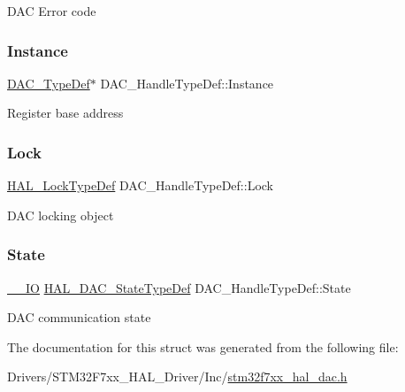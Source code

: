 D\+AC Error code \mbox{\label{struct_d_a_c___handle_type_def_ac25a3f9270f3e98c4104361209ed1a49}} 
\subsubsection{\texorpdfstring{Instance}{Instance}}
{\footnotesize\ttfamily \mbox{\hyperlink{struct_d_a_c___type_def}{D\+A\+C\+\_\+\+Type\+Def}}$\ast$ D\+A\+C\+\_\+\+Handle\+Type\+Def\+::\+Instance}

Register base address \mbox{\label{struct_d_a_c___handle_type_def_a6a7c2021d574c0e6a0aba35be03cf572}} 
\subsubsection{\texorpdfstring{Lock}{Lock}}
{\footnotesize\ttfamily \mbox{\hyperlink{stm32f7xx__hal__def_8h_ab367482e943333a1299294eadaad284b}{H\+A\+L\+\_\+\+Lock\+Type\+Def}} D\+A\+C\+\_\+\+Handle\+Type\+Def\+::\+Lock}

D\+AC locking object \mbox{\label{struct_d_a_c___handle_type_def_a3e25489ceea69107572037728e9ac5f3}} 
\subsubsection{\texorpdfstring{State}{State}}
{\footnotesize\ttfamily \mbox{\hyperlink{core__sc300_8h_aec43007d9998a0a0e01faede4133d6be}{\+\_\+\+\_\+\+IO}} \mbox{\hyperlink{group___d_a_c___exported___types_ga4e917340aba1cc3afd4e9a7fef15e4a5}{H\+A\+L\+\_\+\+D\+A\+C\+\_\+\+State\+Type\+Def}} D\+A\+C\+\_\+\+Handle\+Type\+Def\+::\+State}

D\+AC communication state 

The documentation for this struct was generated from the following file\+:\begin{DoxyCompactItemize}
\item 
Drivers/\+S\+T\+M32\+F7xx\+\_\+\+H\+A\+L\+\_\+\+Driver/\+Inc/\mbox{\hyperlink{stm32f7xx__hal__dac_8h}{stm32f7xx\+\_\+hal\+\_\+dac.\+h}}\end{DoxyCompactItemize}
